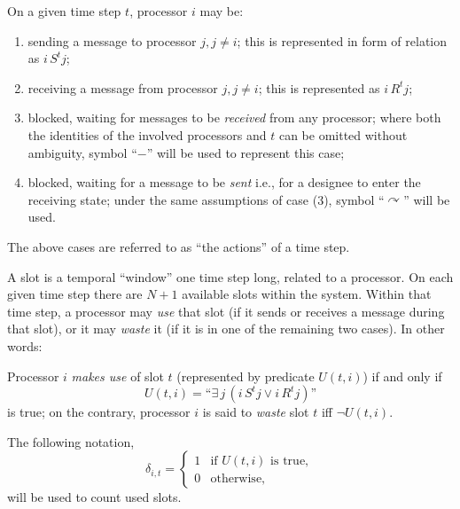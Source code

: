 \documentclass{elsart}
\begin{document}
\begin{defn}[actions]
On a given time step $t$, processor $i$ may be:
  \begin{enumerate}
    \item sending a message to processor $j, j\neq i$; this is represented in form of relation as $i\, S^t j$;
    \item receiving a message from processor $j, j\neq i$; this is represented as $i\, R^t j$;
    \item blocked, waiting for messages to be \emph{received\/} from any processor; 
    where both the identities
    of the involved processors and $t$ can be omitted without
    ambiguity, symbol ``$-$'' will be used to represent this case;
    \item blocked, waiting for a message to be \emph{sent\/} i.e., for a designee
    to enter the receiving state;
    under the same assumptions of case (3), symbol ``$\curvearrowright$''
    will be used.
  \end{enumerate}
The above cases are referred to as ``the actions'' of a time step.
\end{defn}

\begin{defn}
A slot is a temporal ``window'' one time step long, related to a processor.
On each given time step there are $N+1$ available slots within the system.
Within that time step, a processor may \emph{use\/} that slot 
(if it sends or receives a message during that slot), or it may 
\emph{waste\/} it (if it is in one of the remaining two cases). In other words:

\noindent
Processor $i$ \emph{makes use\/} of slot $t$ 
(represented by predicate $U(t,i)$)
if and only if
\[
  U(t,i) = \textrm{``}\exists \, j \, (i\, S^t j \vee i\, R^t j)\textrm{''}
\]
\noindent
is true; on the contrary, processor $i$ is said to \emph{waste\/} slot $t$ if{}f $\neg U(t,i)$.

\noindent
The following notation,
\begin{equation}\label{u}
\delta_{i,t} =
         \begin{cases}
         1&\text{if $U(t,i)$ is true},\\
         0&\text{otherwise},
         \end{cases}
\end{equation}
will be used to count used slots.
\end{defn}
\end{document}
